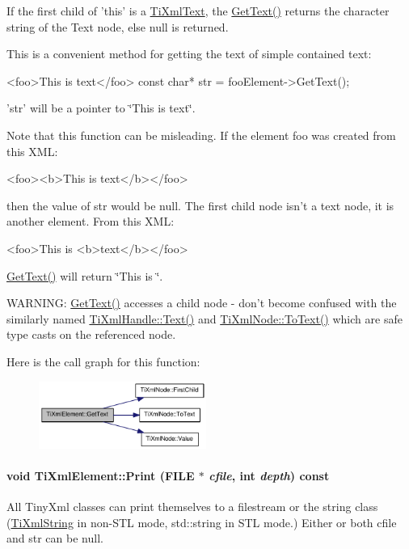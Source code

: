 If the first child of 'this' is a \hyperlink{class_ti_xml_text}{TiXmlText}, the \hyperlink{class_ti_xml_element_aa6dedd8a146acf3b1bc0903deb2d411a}{GetText()} returns the character string of the Text node, else null is returned.

This is a convenient method for getting the text of simple contained text: \begin{DoxyVerb}
		<foo>This is text</foo>
		const char* str = fooElement->GetText();
		\end{DoxyVerb}


'str' will be a pointer to \char`\"{}This is text\char`\"{}.

Note that this function can be misleading. If the element foo was created from this XML: \begin{DoxyVerb}
		<foo><b>This is text</b></foo>
		\end{DoxyVerb}


then the value of str would be null. The first child node isn't a text node, it is another element. From this XML: \begin{DoxyVerb}
		<foo>This is <b>text</b></foo>
		\end{DoxyVerb}
 \hyperlink{class_ti_xml_element_aa6dedd8a146acf3b1bc0903deb2d411a}{GetText()} will return \char`\"{}This is \char`\"{}.

WARNING: \hyperlink{class_ti_xml_element_aa6dedd8a146acf3b1bc0903deb2d411a}{GetText()} accesses a child node -\/ don't become confused with the similarly named \hyperlink{class_ti_xml_handle_a9fc739c8a18d160006f82572fc143d13}{TiXmlHandle::Text()} and \hyperlink{class_ti_xml_node_a3ddfbcac78fbea041fad57e5c6d60a03}{TiXmlNode::ToText()} which are safe type casts on the referenced node. 

Here is the call graph for this function:\nopagebreak
\begin{figure}[H]
\begin{center}
\leavevmode
\includegraphics[width=155pt]{class_ti_xml_element_aa6dedd8a146acf3b1bc0903deb2d411a_cgraph}
\end{center}
\end{figure}
\hypertarget{class_ti_xml_element_ad9d0c008866982ab8d9aafae7e14d692}{
\paragraph[{Print}]{\setlength{\rightskip}{0pt plus 5cm}void TiXmlElement::Print (FILE $\ast$ {\em cfile}, \/  int {\em depth}) const}\hfill}
\label{class_ti_xml_element_ad9d0c008866982ab8d9aafae7e14d692}
All TinyXml classes can print themselves to a filestream or the string class (\hyperlink{class_ti_xml_string}{TiXmlString} in non-\/STL mode, std::string in STL mode.) Either or both cfile and str can be null.

